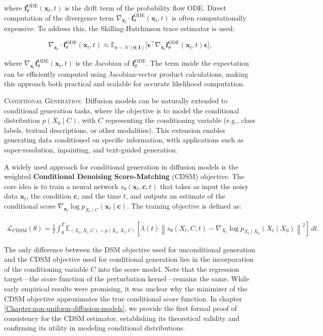 \noindent where \( \mathbf{f}_\theta^{\text{ODE}}(\mathbf{x}_t, t) \) is the drift term of the probability flow ODE. Direct computation of the divergence term \( \nabla_{\mathbf{x}_t} \cdot \mathbf{f}_\theta^{\text{ODE}}(\mathbf{x}_t, t) \) is often computationally expensive. To address this, the Skilling-Hutchinson trace estimator is used:

\[
\nabla_{\mathbf{x}_t} \cdot \mathbf{f}_\theta^{\text{ODE}}(\mathbf{x}_t, t) \approx \mathbb{E}_{\mathbf{\epsilon} \sim \mathcal{N}(\mathbf{0}, \mathbf{I})} \big[ \mathbf{\epsilon}^\top \nabla_{\mathbf{x}_t} \mathbf{f}_\theta^{\text{ODE}}(\mathbf{x}_t, t) \mathbf{\epsilon} \big],
\]

\noindent where \( \nabla_{\mathbf{x}_t} \mathbf{f}_\theta^{\text{ODE}}(\mathbf{x}_t, t) \) is the Jacobian of \( \mathbf{f}_\theta^{\text{ODE}} \). The term inside the expectation can be efficiently computed using Jacobian-vector product calculations, making this approach both practical and scalable for accurate likelihood computation.


\textsc{Conditional Generation.} Diffusion models can be naturally extended to conditional generation tasks, where the objective is to model the conditional distribution \( p(X_0 \mid C) \), with \( C \) representing the conditioning variable (e.g., class labels, textual descriptions, or other modalities). This extension enables generating data conditioned on specific information, with applications such as super-resolution, inpainting, and text-guided generation.

A widely used approach for conditional generation in diffusion models is the weighted \textbf{Conditional Denoising Score-Matching} (CDSM) objective. The core idea is to train a neural network \( s_\theta(\mathbf{x}_t, \mathbf{c}, t) \) that takes as input the noisy data \( \mathbf{x}_t \), the condition \( \mathbf{c} \), and the time \( t \), and outputs an estimate of the conditional score \( \nabla_{\mathbf{x}_t} \log p_{X_t \mid C}(\mathbf{x}_t \mid \mathbf{c}) \). The training objective is defined as:

\begin{align}
    \mathcal{L}_{\text{CDSM}}(\theta) = 
    \frac{1}{2} \int_0^T \mathbb{E}_{(X_0, X_t, C) \sim p(X_0, X_t, C)} 
    \left[ \lambda(t) \left\| s_\theta(X_t, C, t) - \nabla_{X_t} \log p_{X_t \mid X_0}(X_t \mid X_0) \right\|^2 \right] \, dt.
\end{align}

The only difference between the DSM objective used for unconditional generation and the CDSM objective used for conditional generation lies in the incorporation of the conditioning variable \( C \) into the score model. Note that the regression target—the score function of the perturbation kernel—remains the same. While early empirical results were promising, it was unclear why the minimizer of the CDSM objective approximates the true conditional score function. In chapter \ref{Chapter:non-uniform-diffusion-models}, we provide the first formal proof of consistency for the CDSM estimator, establishing its theoretical validity and confirming its utility in modeling conditional distributions.


